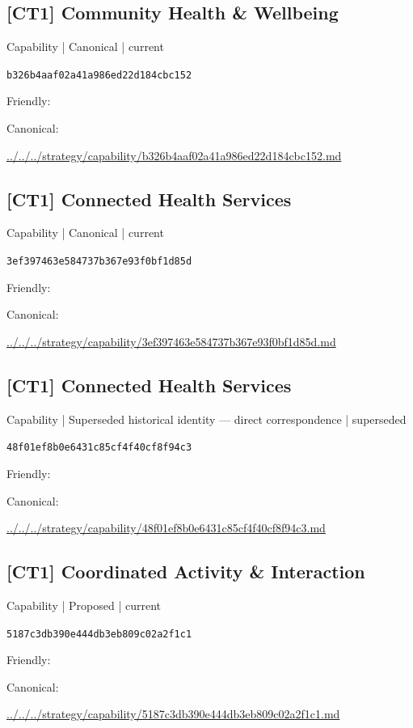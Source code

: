 \documentclass[10pt,a4paper]{article}
\begin{document}
\subsection*{[CT1] Community Health \& Wellbeing}
{\small Capability | Canonical | current}\par
\texttt{b326b4aaf02a41a986ed22d184cbc152}\par
Friendly: \par
Canonical: \par
{\footnotesize\url{../../../strategy/capability/b326b4aaf02a41a986ed22d184cbc152.md}}\par
\subsection*{[CT1] Connected Health Services}
{\small Capability | Canonical | current}\par
\texttt{3ef397463e584737b367e93f0bf1d85d}\par
Friendly: \par
Canonical: \par
{\footnotesize\url{../../../strategy/capability/3ef397463e584737b367e93f0bf1d85d.md}}\par
\subsection*{[CT1] Connected Health Services}
{\small Capability | Superseded historical identity — direct correspondence | superseded}\par
\texttt{48f01ef8b0e6431c85cf4f40cf8f94c3}\par
Friendly: \par
Canonical: \par
{\footnotesize\url{../../../strategy/capability/48f01ef8b0e6431c85cf4f40cf8f94c3.md}}\par
\subsection*{[CT1] Coordinated Activity \& Interaction}
{\small Capability | Proposed | current}\par
\texttt{5187c3db390e444db3eb809c02a2f1c1}\par
Friendly: \par
Canonical: \par
{\footnotesize\url{../../../strategy/capability/5187c3db390e444db3eb809c02a2f1c1.md}}\par
\end{document}
